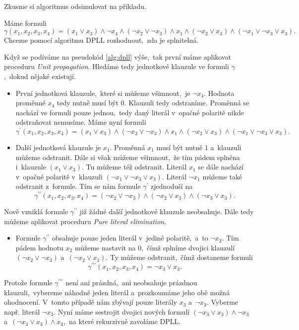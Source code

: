 Zkusme si algoritmus odsimulovat na příkladu.
\begin{example}
    Máme formuli
    \[\gamma(x_1,x_2,x_3,x_4)=(x_1\lor x_3)\land\neg x_4\land(\neg x_2\lor\neg x_3)\land x_1\land(\neg x_2\lor x_3)\land(\neg x_1\lor\neg x_3\lor x_3).\]
    Chceme pomocí algoritmu DPLL rozhodnout,~zda je splnitelná.

    Když se podíváme na pseudokód \ref{alg:dpll} výše,~tak první máme aplikovat proceduru \emph{Unit propagation}. Hledáme tedy jednotkové klauzule ve formuli $\gamma$,~dokud nějaké existují.
    \begin{itemize}
        \item První jednotková klauzule,~které si můžeme všimnout,~je $\neg x_4$. Hodnota proměnné $x_4$ tedy nutně musí být $0$. Klauzuli tedy odstraníme. Proměnná se nachází ve formuli pouze jednou,~tedy daný literál v~opačné polaritě nikde odstraňovat nemusíme. Máme nyní formuli
        \[\gamma^\prime(x_1,x_2,x_3,x_4)=(x_1\lor x_3)\land(\neg x_2\lor\neg x_3)\land x_1\land(\neg x_2\lor x_3)\land(\neg x_1\lor\neg x_3\lor x_3).\]
        \item Další jednotková klauzule je $x_1$. Proměnná $x_1$ musí být nutně $1$ a~klauzuli můžeme odstranit. Dále si však můžeme všimnout,~že tím pádem splněna i~klauzule $(x_1\lor x_3)$. Tu můžeme též odstranit. Literál $x_1$ se dále nachází v~opačné polaritě v~klauzuli $(\neg x_1\lor\neg x_3\lor x_3)$. Literál $\neg x_1$ můžeme také odstranit z~formule. Tím se nám formule $\gamma^\prime$ zjednoduší na
        \[\gamma^{\prime\prime}(x_1,x_2,x_3,x_4)=(\neg x_2\lor\neg x_3)\land (\neg x_2\lor x_3)\land(\neg x_3\lor x_3).\]
    \end{itemize}
    Nově vzniklá formule $\gamma^{\prime\prime}$ již žádné další jednotkové klauzule neobsahuje. Dále tedy můžeme aplikovat proceduru \emph{Pure literal elimination}.
    \begin{itemize}
        \item Formule $\gamma^{\prime\prime}$ obsahuje pouze jeden literál v~jediné polaritě,~a~to $\neg x_2$. Tím pádem hodnotu $x_2$ můžeme nastavit na $0$,~čímž splníme dvojici klauzulí $(\neg x_2\lor\neg x_3)$ a~$(\neg x_2\lor x_3)$. Ty můžeme odstranit,~čímž dostaneme formuli
        \[\gamma^{\prime\prime\prime}(x_1,x_2,x_3,x_4)=\neg x_3\lor x_3.\]
    \end{itemize}
    Protože formule $\gamma^{\prime\prime\prime}$ není ani prázdná,~ani neobsahuje prázdnou klauzuli,~vybereme náhodně jeden literál a~prozkoumáme jeho obě možná ohodnocení. V~tomto případě nám zbývají pouze literály $x_3$ a~$\neg x_3$. Vyberme např. literál $\neg x_3$. Nyní máme sestrojit dvojici nových formulí $(\neg x_3\lor x_3)\land\neg x_3$ a~$(\neg x_3\lor x_3)\land x_3$,~na které rekurzivně zavoláme DPLL.

\end{example}

